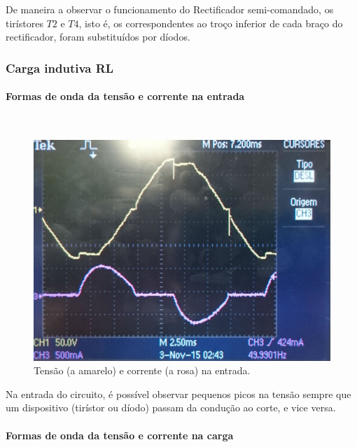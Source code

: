 \documentclass[a4paper,11pt]{article}
\numberwithin{equation}{section}
\begin{document}
De maneira a observar o funcionamento do Rectificador semi-comandado, os tirístores $T2$ e $T4$, isto é, os correspondentes ao troço inferior de cada braço do rectificador, foram substituídos por díodos.

\subsubsection{Carga indutiva RL}

\paragraph{Formas de onda da tensão e corrente na entrada} \mbox{}\

\begin{figure}[H]
	\centering
	\includegraphics[keepaspectratio=true, scale=0.12]{img/DSC_0190}
	\caption{Tensão (a amarelo) e corrente (a rosa) na entrada.}
	\label{fig:tcentradasemi}
	\vspace{-0.8em}
\end{figure}

Na entrada do circuito, é possível observar pequenos picos na tensão sempre que um dispositivo (tirístor ou díodo) passam da condução ao corte, e vice versa.

\paragraph{Formas de onda da tensão e corrente na carga} \mbox{}\
\end{document}

